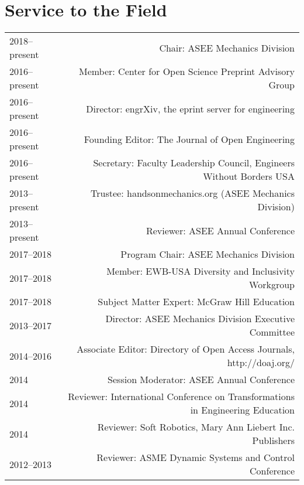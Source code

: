 \section*{Service to the Field}
\begin{tabular}{L!{\VRule}R}
2018--present&Chair: ASEE Mechanics Division\\
2016--present&Member: Center for Open Science Preprint Advisory Group\\
2016--present&Director: engrXiv, the eprint server for engineering\\
2016--present&Founding Editor: The Journal of Open Engineering\\
2016--present&Secretary: Faculty Leadership Council, Engineers Without Borders USA\\
2013--present&Trustee: handsonmechanics.org (ASEE Mechanics Division)\\
2013--present&Reviewer: ASEE Annual Conference\\
2017--2018&Program Chair: ASEE Mechanics Division\\
2017--2018&Member: EWB-USA Diversity and Inclusivity Workgroup\\
2017--2018&Subject Matter Expert: McGraw Hill Education\\
2013--2017&Director: ASEE Mechanics Division Executive Committee\\
2014--2016&Associate Editor: Directory of Open Access Journals, http://doaj.org/\\
2014&Session Moderator: ASEE Annual Conference\\
2014&Reviewer: International Conference on Transformations in Engineering Education\\
2014&Reviewer: Soft Robotics, Mary Ann Liebert Inc. Publishers\\
2012--2013&Reviewer: ASME Dynamic Systems and Control Conference\\
\end{tabular}